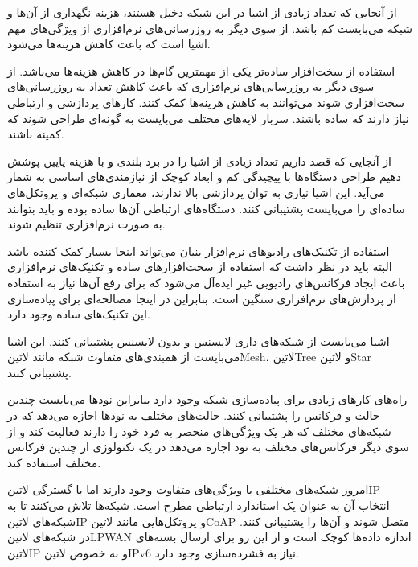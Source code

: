 
از آنجایی که تعداد زیادی از اشیا در این شبکه دخیل هستند، هزینه نگهداری از آن‌ها و شبکه می‌بایست کم باشد.
از سوی دیگر به روزرسانی‌های نرم‌افزاری از ویژگی‌های مهم اشیا است که باعث کاهش هزینه‌ها می‌شود.

استفاده از سخت‌افزار ساده‌تر یکی از مهمترین گام‌ها در کاهش هزینه‌ها می‌باشد. از سوی دیگر به روزرسانی‌های
نرم‌افزاری که باعث کاهش تعداد به روزرسانی‌های سخت‌افزاری شوند می‌توانند به کاهش هزینه‌ها کمک کنند.
کارهای پردازشی و ارتباطی نیاز دارند که ساده باشند. سربار لایه‌های مختلف می‌بایست به گونه‌ای طراحی شوند
که کمینه باشند.


از آنجایی که قصد داریم تعداد زیادی از اشیا را در برد بلندی و با هزینه پایین پوشش دهیم طراحی دستگاه‌ها با پیچیدگی کم
و ابعاد کوچک از نیازمندی‌های اساسی به شمار می‌آید. این اشیا نیازی به توان پردازشی بالا ندارند، معماری شبکه‌ای و پروتکل‌های
ساده‌ای را می‌بایست پشتیبانی کنند. دستگاه‌های ارتباطی آن‌ها ساده بوده و باید بتوانند به صورت نرم‌افزاری تنظیم شوند.

استفاده از تکنیک‌های رادیوهای نرم‌افزار بنیان می‌تواند اینجا بسیار کمک کننده باشد
البته باید در نظر داشت که استفاده از سخت‌افزارهای ساده و تکنیک‌های نرم‌افزاری
باعث ایجاد فرکانس‌های رادیویی غیر ایده‌آل می‌شود که برای رفع آن‌ها نیاز به استفاده
از پردازش‌های نرم‌افزاری سنگین است. بنابراین در اینجا مصالحه‌ای برای پیاده‌سازی
این تکنیک‌های ساده وجود دارد.


اشیا می‌بایست از شبکه‌های داری لایسنس و بدون لایسنس پشتیبانی کنند.
این اشیا می‌بایست از همبندی‌های متفاوت شبکه مانند ‌لاتین{Mesh}، ‌لاتین{Tree} و ‌لاتین{Star} پشتیبانی کنند.

راه‌های کارهای زیادی برای پیاده‌سازی شبکه وجود دارد بنابراین نودها می‌بایست چندین حالت و فرکانس را پشتیبانی کنند.
حالت‌های مختلف به نودها اجازه می‌دهد که در شبکه‌های مختلف که هر یک ویژگی‌های منحصر به فرد خود را دارند
فعالیت کند و از سوی دیگر فرکانس‌های مختلف به نود اجازه می‌دهد در یک تکنولوژی از چندین فرکانس مختلف استفاده کند.


امروز شبکه‌های مختلفی با ویژگی‌های متفاوت وجود دارند اما با گسترگی ‌لاتین{IP} انتخاب آن به عنوان
یک استاندارد ارتباطی مطرح است. شبکه‌ها تلاش می‌کنند تا به شبکه‌های ‌لاتین{IP} و پروتکل‌هایی مانند
‌لاتین{CoAP} متصل شوند و آن‌ها را پشتیبانی کنند.
در شبکه‌های ‌لاتین{LPWAN} اندازه داده‌ها کوچک است و از این رو برای ارسال بسته‌های ‌لاتین{IP} و
به خصوص ‌لاتین{IPv6} نیاز به فشرده‌سازی وجود دارد.

